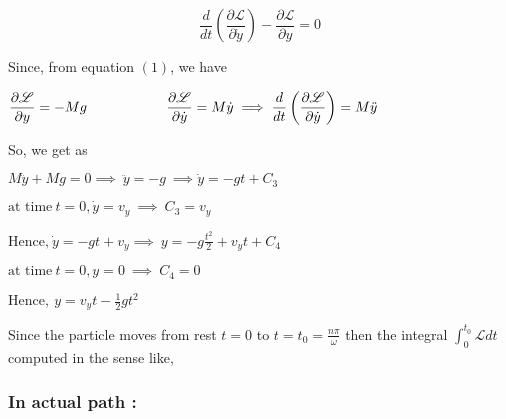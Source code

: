 \documentclass[12pt, a4paper]{article} %
\begin{document}
\begin{equation*}
    \frac{d}{dt}\left(\frac{\partial \mathscr{L}}{\partial \dot{y}}\right) - \frac{\partial \mathscr{L}}{\partial y} = 0
\end{equation*}


Since, from equation $(1)$, we have


\begin{center}
    $\displaystyle \frac{\partial \mathscr{L}}{\partial y} = -Mg \hspace*{2cm} \frac{\partial \mathscr{L}}{\partial \dot{y}} = M\dot{y} \implies \frac{d}{dt}\left(\frac{\partial \mathscr{L}}{\partial \dot{y}}\right) = M\ddot{y}$
\end{center}

So, we get as 

\begin{center}
    $M\ddot{y} + Mg = 0 \implies\ \ddot{y} = -g\ \implies \dot{y} = -gt + C_3$
\end{center}

\begin{center}
    $\displaystyle \mbox{at time}\ t=0, \dot{y} = v_y \ \implies\ C_3 = v_y$
\end{center}

\begin{center}
    $\displaystyle \mbox{Hence,}\ \dot{y} = -gt + v_y \implies\ y = -g\frac{t^2}{2} + v_y t + C_4$
\end{center}

\begin{center}
    $\displaystyle \mbox{at time}\ t=0, y = 0 \ \implies\ C_4 = 0$
\end{center}

\begin{center}
    $\mbox{Hence},\ \boxed{y = v_y t - \frac{1}{2} gt^2}$
\end{center}

Since the particle moves from rest $t = 0$ to $\displaystyle t = t_0 = \frac{n \pi}{\omega}$ then the integral $\displaystyle \int_{0}^{t_0} \mathscr{L} dt$ computed in the sense like,

\subsubsection*{In actual path :}
\end{document}
